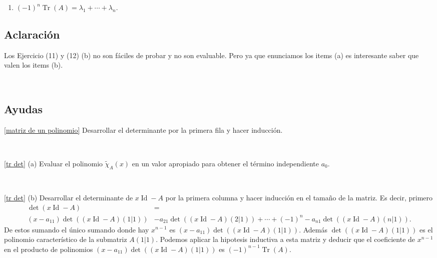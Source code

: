 \documentclass[12pt]{amsart}
\begin{document}
\begin{enumerate}[resume]
\begin{multicols}{2}
\begin{enumerate}
	\
	
	\item $(-1)^n\operatorname{Tr}(A)=\lambda_1+\cdots+\lambda_n$.
\end{enumerate}
\end{multicols}

\subsection*{Aclaraci\'on} 
Los Ejercicio (11) y (12) (b) no son f\'aciles de probar y no son evaluable. Pero ya que enunciamos los items (a) es interesante saber que valen los items (b).
% 
% 

\end{enumerate}


\

\subsection*{Ayudas}

\eqref{matriz de un polinomio} Desarrollar el determinante por la primera fila y hacer inducci\'on.

\

\eqref{tr det} (a) Evaluar el polinomio $\tilde\chi_A(x)$ en un valor apropiado para obtener el t\'ermino independiente $a_0$.

\

\eqref{tr det} (b) Desarrollar el determinante de $x\operatorname{Id}-A$ por la primera columna y hacer inducci\'on en el tama\~no de la matriz. Es decir, primero 
\begin{align*}
\det(x\operatorname{Id}-A)&=\\
(x-a_{11})\det((x\operatorname{Id}-A)(1|1))&-a_{21}\det((x\operatorname{Id}-A)(2|1))+\cdots+(-1)^n-a_{n1}\det((x\operatorname{Id}-A)(n|1)).
\end{align*}
De estos sumando el \'unico sumando donde hay $x^{n-1}$ es $(x-a_{11})\det((x\operatorname{Id}-A)(1|1))$. Adem\'as $\det((x\operatorname{Id}-A)(1|1))$ es el polinomio caracter\'istico de la submatriz $A(1|1)$. Podemos aplicar la hipotesis inductiva a esta matriz y deducir que el coeficiente de $x^{n-1}$ en el producto de polinomios $(x-a_{11})\det((x\operatorname{Id}-A)(1|1))$ es $(-1)^{n-1}\operatorname{Tr}(A)$.
\end{document}
